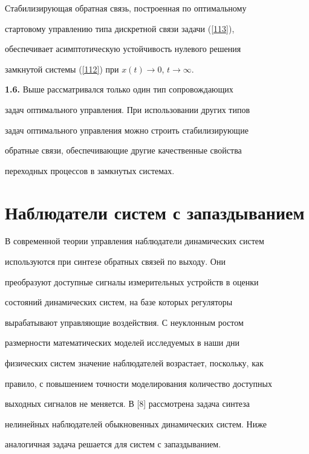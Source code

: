 Стабилизирующая обратная связь, построенная по оптимальному


стартовому управлению типа дискретной связи задачи (\ref{113}),


обеспечивает асимптотическую устойчивость нулевого решения


замкнутой системы (\ref{112}) при $x(t) \rightarrow 0$, $t \rightarrow


\infty$.


\medskip





{\bf 1.6.} Выше рассматривался только один тип сопровождающих


задач оптимального управления. При использовании других типов


задач оптимального управления можно строить стабилизирующие


обратные связи, обеспечивающие другие качественные свойства


переходных процессов в замкнутых системах.








\section{Наблюдатели систем с запаздыванием}





В современной теории управления наблюдатели динамических систем


используются при синтезе обратных связей по выходу. Они


преобразуют доступные сигналы измерительных устройств в оценки


состояний динамических систем, на базе которых регуляторы


вырабатывают управляющие воздействия. С неуклонным ростом


размерности математических моделей исследуемых в наши дни


физических систем значение наблюдателей возрастает, поскольку, как


правило, с повышением точности моделирования количество доступных


выходных сигналов не меняется. В [8] рассмотрена задача синтеза


нелинейных наблюдателей обыкновенных динамических систем. Ниже


аналогичная задача решается для систем с запаздыванием.


